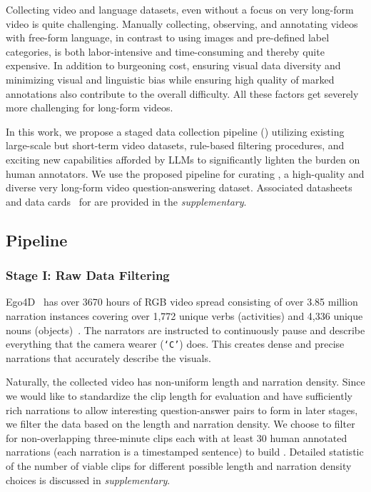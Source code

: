 Collecting video and language datasets, even without a focus on very long-form video is quite challenging. Manually collecting, observing, and annotating videos with free-form language, in contrast to using images and pre-defined label categories, is both labor-intensive and time-consuming and thereby quite expensive. In addition to burgeoning cost, ensuring visual data diversity and minimizing visual and linguistic bias while ensuring high quality of marked annotations also contribute to the overall difficulty. All these factors get severely more challenging for long-form videos. 

In this work, we propose a staged data collection pipeline () utilizing existing large-scale but short-term video datasets, rule-based filtering procedures, and exciting new capabilities afforded by LLMs to significantly lighten the burden on human annotators. We use the proposed pipeline for curating \name{}{}, a high-quality and diverse very long-form video question-answering dataset. Associated datasheets~\cite{datasheets} and data cards~\cite{pushkarna2022data} for \name{}{} are provided in the \textit{supplementary}. 
\subsection{\name{}{} Pipeline}
\subsubsection{Stage I: Raw Data Filtering}
\label{sec:stage1}
Ego4D~\cite{ego4d} has over 3670 hours of RGB video spread consisting of over 3.85 million narration instances covering over 1,772 unique verbs (activities) and 4,336 unique nouns (objects)~\cite{ego4d}. The narrators are instructed to continuously pause and describe everything that the camera wearer (\texttt{`C'}) does. This creates dense and precise narrations that accurately describe the visuals. 

Naturally, the collected video has non-uniform length and narration density. Since we would like to standardize the clip length for evaluation and have sufficiently rich narrations to allow interesting question-answer pairs to form in later stages, we filter the data based on the length and narration density. We choose to filter for non-overlapping three-minute clips each with at least 30 human annotated narrations (each narration is a timestamped sentence) to build \name{}{}. Detailed statistic of the number of viable clips for different possible length and narration density choices is discussed in \textit{supplementary}. 

